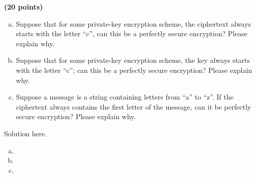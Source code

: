 \documentclass[12pt]{hw}
\begin{document}
\begin{exercise}
  \textbf{(20 points)} 
\begin{enumerate}[(a)]
\item 
Suppose that for some private-key encryption scheme,
the ciphertext always starts with the letter ``c'', 
can this be a perfectly secure encryption?
Please explain why.
\item 
Suppose that for some private-key encryption scheme,
the key always starts with the letter ``c''; 
can this be a perfectly secure encryption?
Please explain why.
\item 
Suppose a message is a string containing letters from 
``a'' to ``z''. If the ciphertext always contains the first letter of the message, can it be perfectly secure encryption? 
Please explain why.
\end{enumerate}
\end{exercise}

\begin{answer}
  Solution here.
  \begin{enumerate}[(a)]
  \item

  \item

  \item
  \end{enumerate}
\end{answer}

\end{document}
